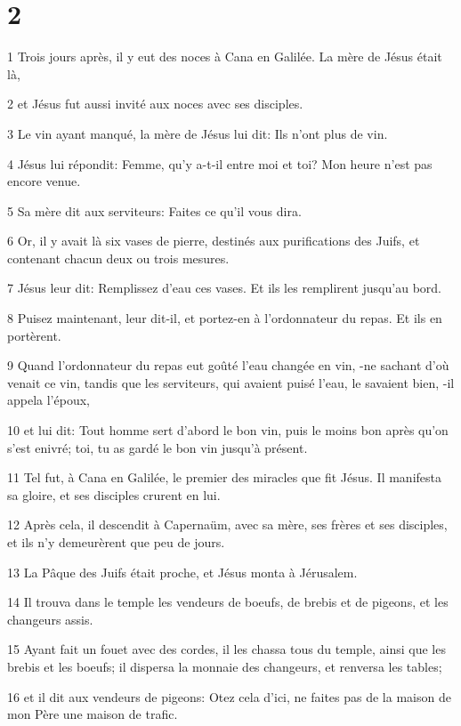 \chapter{2}

\par 1 Trois jours après, il y eut des noces à Cana en Galilée. La mère de Jésus était là,
\par 2 et Jésus fut aussi invité aux noces avec ses disciples.
\par 3 Le vin ayant manqué, la mère de Jésus lui dit: Ils n'ont plus de vin.
\par 4 Jésus lui répondit: Femme, qu'y a-t-il entre moi et toi? Mon heure n'est pas encore venue.
\par 5 Sa mère dit aux serviteurs: Faites ce qu'il vous dira.
\par 6 Or, il y avait là six vases de pierre, destinés aux purifications des Juifs, et contenant chacun deux ou trois mesures.
\par 7 Jésus leur dit: Remplissez d'eau ces vases. Et ils les remplirent jusqu'au bord.
\par 8 Puisez maintenant, leur dit-il, et portez-en à l'ordonnateur du repas. Et ils en portèrent.
\par 9 Quand l'ordonnateur du repas eut goûté l'eau changée en vin, -ne sachant d'où venait ce vin, tandis que les serviteurs, qui avaient puisé l'eau, le savaient bien, -il appela l'époux,
\par 10 et lui dit: Tout homme sert d'abord le bon vin, puis le moins bon après qu'on s'est enivré; toi, tu as gardé le bon vin jusqu'à présent.
\par 11 Tel fut, à Cana en Galilée, le premier des miracles que fit Jésus. Il manifesta sa gloire, et ses disciples crurent en lui.
\par 12 Après cela, il descendit à Capernaüm, avec sa mère, ses frères et ses disciples, et ils n'y demeurèrent que peu de jours.
\par 13 La Pâque des Juifs était proche, et Jésus monta à Jérusalem.
\par 14 Il trouva dans le temple les vendeurs de boeufs, de brebis et de pigeons, et les changeurs assis.
\par 15 Ayant fait un fouet avec des cordes, il les chassa tous du temple, ainsi que les brebis et les boeufs; il dispersa la monnaie des changeurs, et renversa les tables;
\par 16 et il dit aux vendeurs de pigeons: Otez cela d'ici, ne faites pas de la maison de mon Père une maison de trafic.
